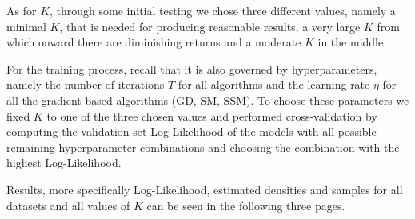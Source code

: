 As for $K$, through some initial testing we chose three different values, namely a minimal $K$, that is needed for producing reasonable results, 
a very large $K$ from which onward there are diminishing returns and a moderate $K$ in the middle.

For the training process, recall that it is also governed by hyperparameters, namely the number of iterations $T$ for all algorithms and 
the learning rate $\eta$ for all the gradient-based algorithms (GD, SM, SSM).
To choose these parameters we fixed $K$ to one of the three chosen values and performed cross-validation by computing the validation set Log-Likelihood 
of the models with all possible remaining hyperparameter combinations and choosing the combination with the highest Log-Likelihood.

Results, more specifically Log-Likelihood, estimated densities and samples for all datasets and all values of $K$ can be seen in the following three pages.  

